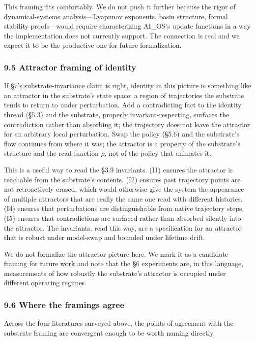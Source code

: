 \documentclass[11pt,letterpaper]{article}
\begin{document}
This framing fits comfortably. We do not push it further because the rigor of dynamical-systems analysis---Lyapunov exponents, basin structure, formal stability proofs---would require characterizing AI\_OS's update functions in a way the implementation does not currently support. The connection is real and we expect it to be the productive one for future formalization.

\subsubsection*{9.5 Attractor framing of identity}

If §7's substrate-invariance claim is right, identity in this picture is something like an attractor in the substrate's state space: a region of trajectories the substrate tends to return to under perturbation. Add a contradicting fact to the identity thread (§5.3) and the substrate, properly invariant-respecting, surfaces the contradiction rather than absorbing it; the trajectory does not leave the attractor for an arbitrary local perturbation. Swap the policy (§5.6) and the substrate's flow continues from where it was; the attractor is a property of the substrate's structure and the read function $\rho$, not of the policy that animates it.

This is a useful way to read the §3.9 invariants. (I1) ensures the attractor is reachable from the substrate's contents. (I2) ensures past trajectory points are not retroactively erased, which would otherwise give the system the appearance of multiple attractors that are really the same one read with different histories. (I4) ensures that perturbations are distinguishable from native trajectory steps. (I5) ensures that contradictions are surfaced rather than absorbed silently into the attractor. The invariants, read this way, are a specification for an attractor that is robust under model-swap and bounded under lifetime drift.

We do not formalize the attractor picture here. We mark it as a candidate framing for future work and note that the §6 experiments are, in this language, measurements of how robustly the substrate's attractor is occupied under different operating regimes.

\subsubsection*{9.6 Where the framings agree}

Across the four literatures surveyed above, the points of agreement with the substrate framing are convergent enough to be worth naming directly.
\end{document}

